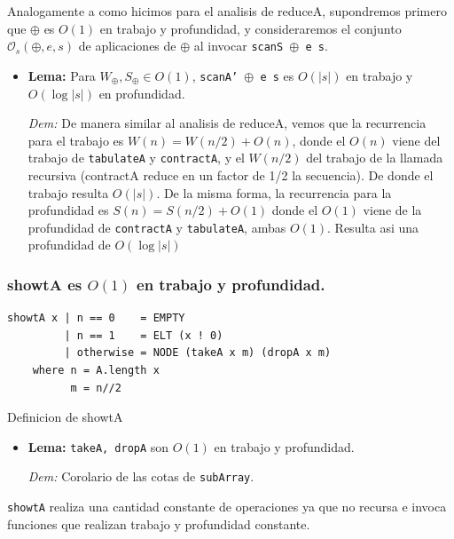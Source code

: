 \documentclass[12pt]{article}
\begin{document}
Analogamente a como hicimos para el analisis de reduceA, supondremos primero que $\oplus$ es $O(1)$ en trabajo y profundidad, y consideraremos el conjunto $\mathcal{O}_s(\oplus,e,s)$ de aplicaciones de $\oplus$ al invocar \texttt{scanS $\oplus$ e s}.

\begin{itemize}
\item \textbf{Lema:} Para $W_\oplus,S_\oplus \in O(1)$, \texttt{scanA' $\oplus$ e s} es $O(|s|)$ en trabajo y $O(\log |s|)$ en profundidad.

 \textit{Dem:} De manera similar al analisis de reduceA, vemos que la recurrencia para el trabajo es $W(n) = W(n/2) + O(n)$, donde el $O(n)$  viene del trabajo de \texttt{tabulateA} y \texttt{contractA}, y el $W(n/2)$ del trabajo de la llamada recursiva (contractA reduce en un factor de 1/2 la secuencia). De donde el trabajo resulta $O(|s|)$. De la misma forma, la recurrencia para la profundidad es $S(n) = S(n/2) + O(1)$ donde el $O(1)$ viene de la profundidad de \texttt{contractA} y \texttt{tabulateA}, ambas $O(1)$. Resulta asi una profundidad de $O(\log |s|)$
\end{itemize}

\subsubsection{showtA es $O(1)$ en trabajo y profundidad.}

\begin{table}[h]
\begin{lstlisting}
showtA x | n == 0    = EMPTY 
         | n == 1    = ELT (x ! 0)
         | otherwise = NODE (takeA x m) (dropA x m)
    where n = A.length x
          m = n//2
\end{lstlisting}
\caption{Definicion de showtA}
\end{table}

\begin{itemize}
\item \textbf{Lema:}  \texttt{takeA, dropA} son $O(1)$ en trabajo y profundidad.

 \textit{Dem:} Corolario de las cotas de \texttt{subArray}.
\end{itemize}

\texttt{showtA} realiza una cantidad constante de operaciones ya que no recursa e invoca funciones que realizan trabajo y profundidad constante.
\end{document}
